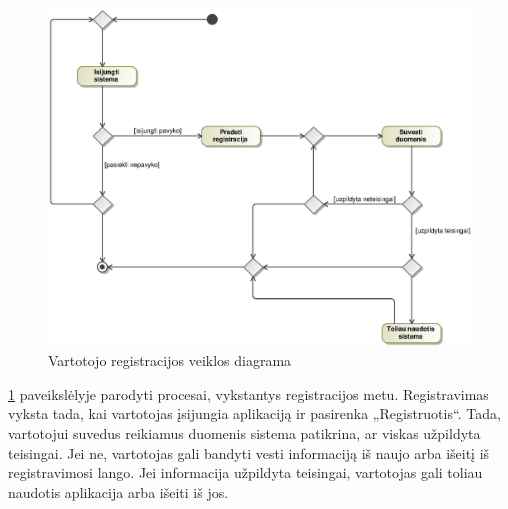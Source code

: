\documentclass[12pt]{article}
\begin{document}
	\begin{figure}[h]
		\begin{center}
			\includegraphics[width=\textwidth]{RegistracijosVeikla.eps}
			\caption{Vartotojo registracijos veiklos diagrama\label{RegisterActivity}}
		\end{center}
	\end{figure}
	
	\ref{RegisterActivity} paveikslėlyje parodyti procesai, vykstantys registracijos metu. Registravimas vyksta tada, kai vartotojas įsijungia aplikaciją ir pasirenka „Registruotis“. Tada, vartotojui suvedus reikiamus duomenis sistema patikrina, ar viskas užpildyta teisingai. Jei ne, vartotojas gali bandyti vesti informaciją iš naujo arba išeitį iš registravimosi lango. Jei informacija užpildyta teisingai, vartotojas gali toliau naudotis aplikacija arba išeiti iš jos.
	\pagebreak
	
\end{document}
